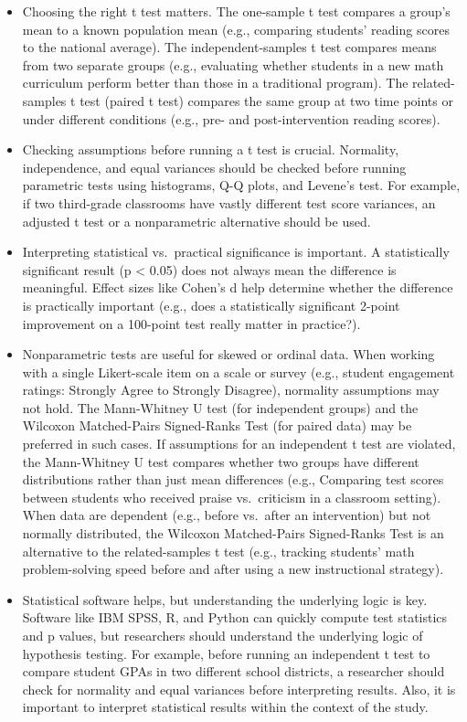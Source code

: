 \documentclass[
  letterpaper,
  DIV=11,
  numbers=noendperiod]{scrreprt}
\begin{document}
\begin{itemize}
\item
  Choosing the right t test matters. The one-sample t test compares a
  group's mean to a known population mean (e.g., comparing students'
  reading scores to the national average). The independent-samples t
  test compares means from two separate groups (e.g., evaluating whether
  students in a new math curriculum perform better than those in a
  traditional program). The related-samples t test (paired t test)
  compares the same group at two time points or under different
  conditions (e.g., pre- and post-intervention reading scores).
\item
  Checking assumptions before running a t test is crucial. Normality,
  independence, and equal variances should be checked before running
  parametric tests using histograms, Q-Q plots, and Levene's test. For
  example, if two third-grade classrooms have vastly different test
  score variances, an adjusted t test or a nonparametric alternative
  should be used.
\item
  Interpreting statistical vs.~practical significance is important. A
  statistically significant result (p \textless{} 0.05) does not always
  mean the difference is meaningful. Effect sizes like Cohen's d help
  determine whether the difference is practically important (e.g., does
  a statistically significant 2-point improvement on a 100-point test
  really matter in practice?).
\item
  Nonparametric tests are useful for skewed or ordinal data. When
  working with a single Likert-scale item on a scale or survey (e.g.,
  student engagement ratings: Strongly Agree to Strongly Disagree),
  normality assumptions may not hold. The Mann-Whitney U test (for
  independent groups) and the Wilcoxon Matched-Pairs Signed-Ranks Test
  (for paired data) may be preferred in such cases. If assumptions for
  an independent t test are violated, the Mann-Whitney U test compares
  whether two groups have different distributions rather than just mean
  differences (e.g., Comparing test scores between students who received
  praise vs.~criticism in a classroom setting). When data are dependent
  (e.g., before vs.~after an intervention) but not normally distributed,
  the Wilcoxon Matched-Pairs Signed-Ranks Test is an alternative to the
  related-samples t test (e.g., tracking students' math problem-solving
  speed before and after using a new instructional strategy).
\item
  Statistical software helps, but understanding the underlying logic is
  key. Software like IBM SPSS, R, and Python can quickly compute test
  statistics and p values, but researchers should understand the
  underlying logic of hypothesis testing. For example, before running an
  independent t test to compare student GPAs in two different school
  districts, a researcher should check for normality and equal variances
  before interpreting results. Also, it is important to interpret
  statistical results within the context of the study.
\end{itemize}
\end{document}
